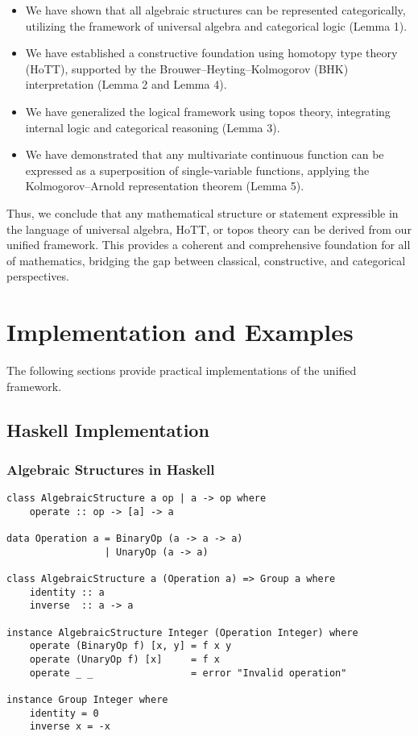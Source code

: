 \documentclass{article}
\begin{document}
\begin{itemize}
    \item We have shown that all algebraic structures can be represented categorically, utilizing the framework of universal algebra and categorical logic (Lemma 1).
    \item We have established a constructive foundation using homotopy type theory (HoTT), supported by the Brouwer–Heyting–Kolmogorov (BHK) interpretation (Lemma 2 and Lemma 4).
    \item We have generalized the logical framework using topos theory, integrating internal logic and categorical reasoning (Lemma 3).
    \item We have demonstrated that any multivariate continuous function can be expressed as a superposition of single-variable functions, applying the Kolmogorov–Arnold representation theorem (Lemma 5).
\end{itemize}

Thus, we conclude that any mathematical structure or statement expressible in the language of universal algebra, HoTT, or topos theory can be derived from our unified framework. This provides a coherent and comprehensive foundation for all of mathematics, bridging the gap between classical, constructive, and categorical perspectives.


\section{Implementation and Examples}

The following sections provide practical implementations of the unified framework.

\subsection{Haskell Implementation}


\subsubsection{Algebraic Structures in Haskell}

\begin{lstlisting}
class AlgebraicStructure a op | a -> op where
    operate :: op -> [a] -> a

data Operation a = BinaryOp (a -> a -> a)
                 | UnaryOp (a -> a)

class AlgebraicStructure a (Operation a) => Group a where
    identity :: a
    inverse  :: a -> a

instance AlgebraicStructure Integer (Operation Integer) where
    operate (BinaryOp f) [x, y] = f x y
    operate (UnaryOp f) [x]     = f x
    operate _ _                 = error "Invalid operation"

instance Group Integer where
    identity = 0
    inverse x = -x
\end{lstlisting}
\end{document}
